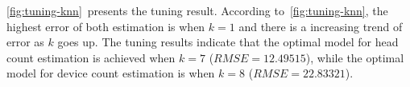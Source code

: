 	\autoref{fig:tuning-knn}~presents the tuning result.
	According to~\autoref{fig:tuning-knn}, the highest error of both estimation is when $k=1$ and there is a increasing trend of error as $k$ goes up.
		The tuning results indicate that the optimal model for head count estimation is achieved when $k=7$ ($RMSE=12.49515$), while the optimal model for device count estimation is when $k=8$ ($RMSE=22.83321$).










